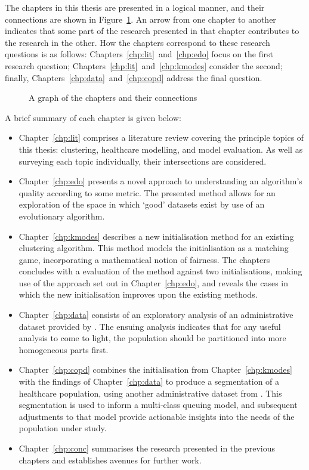 The chapters in this thesis are presented in a logical manner, and their
connections are shown in Figure~\ref{fig:structure}. An arrow from one chapter
to another indicates that some part of the research presented in that chapter
contributes to the research in the other. How the chapters correspond to these
research questions is as follows: Chapters~\ref{chp:lit}~and~\ref{chp:edo} focus
on the first research question; Chapters~\ref{chp:lit}~and~\ref{chp:kmodes}
consider the second; finally, Chapters~\ref{chp:data}~and~\ref{chp:copd} address
the final question.

\begin{figure}
    \centering%
    \resizebox{\imgwidth}{!}{%
    
    }
    \caption{A graph of the chapters and their connections}\label{fig:structure}
\end{figure}

A brief summary of each chapter is given below:

\begin{itemize}
    \item Chapter~\ref{chp:lit} comprises a literature review covering the
        principle topics of this thesis: clustering, healthcare modelling, and
        model evaluation. As well as surveying each topic individually, their
        intersections are considered.
    \item Chapter~\ref{chp:edo} presents a novel approach to understanding an
        algorithm's quality according to some metric. The presented method
        allows for an exploration of the space in which `good' datasets exist
        by use of an evolutionary algorithm.
    \item Chapter~\ref{chp:kmodes} describes a new initialisation method for an
        existing clustering algorithm. This method models the initialisation as
        a matching game, incorporating a mathematical notion of fairness. The
        chapters concludes with a evaluation of the method against two
        initialisations, making use of the approach set out in
        Chapter~\ref{chp:edo}, and reveals the cases in which the new
        initialisation improves upon the existing methods.
    \item Chapter~\ref{chp:data} consists of an exploratory analysis of an
        administrative dataset provided by \ctmuhb. The ensuing analysis
        indicates that for any useful analysis to come to light, the population
        should be partitioned into more homogeneous parts first.
    \item Chapter~\ref{chp:copd} combines the initialisation from
        Chapter~\ref{chp:kmodes} with the findings of Chapter~\ref{chp:data} to
        produce a segmentation of a healthcare population, using another
        administrative dataset from \ctmuhb. This segmentation is used to inform
        a multi-class queuing model, and subsequent adjustments to that model
        provide actionable insights into the needs of the population under
        study.
    \item Chapter~\ref{chp:conc} summarises the research presented in the
        previous chapters and establishes avenues for further work.
\end{itemize}

